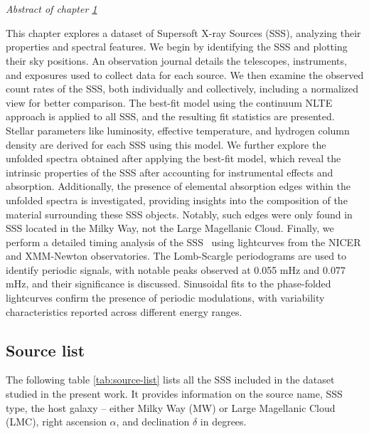 \def\baselinestretch{1}
\chapter{\MakeUppercase{\ChapterTitleSix}} \label{chap:results}
    \minitoc
    
    \newpage
    \begin{center}
    	\emph{Abstract of chapter \ref{chap:results}}
    \end{center}
    This chapter explores a dataset of Supersoft X-ray Sources (SSS), analyzing their properties and spectral features. We begin by identifying the SSS and plotting their sky positions. An observation journal details the telescopes, instruments, and exposures used to collect data for each source. We then examine the observed count rates of the SSS, both individually and collectively, including a normalized view for better comparison. The best-fit model using the continuum NLTE approach is applied to all SSS, and the resulting fit statistics are presented. Stellar parameters like luminosity, effective temperature, and hydrogen column density are derived for each SSS using this model. We further explore the unfolded spectra obtained after applying the best-fit model, which reveal the intrinsic properties of the SSS after accounting for instrumental effects and absorption. Additionally, the presence of elemental absorption edges within the unfolded spectra is investigated, providing insights into the composition of the material surrounding these SSS objects. Notably, such edges were only found in SSS located in the Milky Way, not the Large Magellanic Cloud. Finally, we perform a detailed timing analysis of the SSS \source\ using lightcurves from the NICER and XMM-Newton observatories. The Lomb-Scargle periodograms are used to identify periodic signals, with notable peaks observed at 0.055 mHz and 0.077 mHz, and their significance is discussed. Sinusoidal fits to the phase-folded lightcurves confirm the presence of periodic modulations, with variability characteristics reported across different energy ranges.
    
    \newpage
    \section{Source list} \label{results:source-list}
    	The following table \ref{tab:source-list} lists all the SSS included in the dataset studied in the present work. It provides information on the source name, SSS type, the host galaxy -- either Milky Way (MW) or Large Magellanic Cloud (LMC), right ascension $\alpha$, and declination $\delta$ in degrees.
    	
